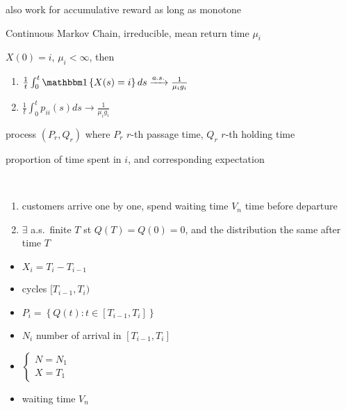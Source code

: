 \begin{fact}
    also work for accumulative reward as long as monotone
\end{fact}

\begin{setting}
    Continuous Markov Chain, irreducible, mean return time $\mu_i$
\end{setting}

\begin{thm}
    $X(0) = i$, $\mu_i < \infty$, then
    \begin{enumerate}
        \item $\frac{1}{t}\int_0^t \In\left\{ X(s) = i \right\}ds \rightarrowas \frac{1}{\mu_i g_i}$
        \item $\frac{1}{t}\int_0^t p_{ii}(s)ds \rightarrow \frac{1}{\mu_i g_i}$
    \end{enumerate}
\end{thm}
\begin{pf}
    process $(P_r, Q_r)$ where $P_r$ $r$-th passage time, $Q_r$ $r$-th holding time
\end{pf}

\begin{fact}
    proportion of time spent in $i$, and corresponding expectation
\end{fact}

\begin{assumption}\,
    \begin{enumerate}
        \item customers arrive one by one, spend waiting time $V_n$ time before departure
        \item $\exists$ a.s.\ finite $T$ st $Q(T) = Q(0) = 0$, and the distribution the same after time $T$
    \end{enumerate}
\end{assumption}

\begin{itemize}
    \item $X_i = T_i - T_{i-1}$
    \item cycles $[T_{i-1}, T_i)$
    \item $P_i = \left\{ Q(t) : t\in [T_{i-1}, T_i] \right\}$
    \item $N_i$ number of arrival in $[T_{i-1}, T_i]$
    \item $\begin{cases}
               N = N_1\\
               X = T_1
    \end{cases}$
    \item waiting time $V_n$
\end{itemize}

